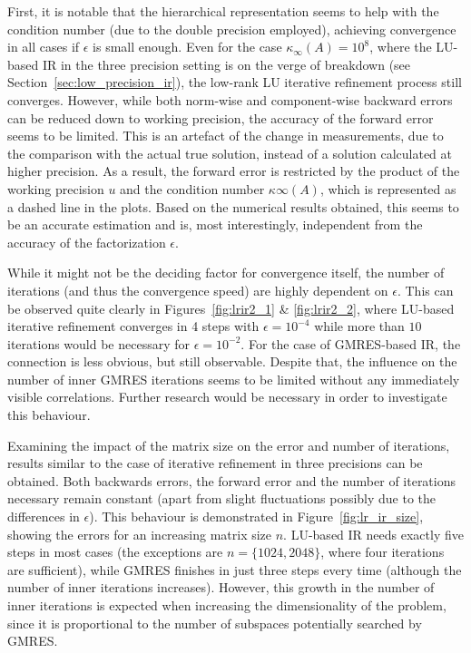 First, it is notable that the hierarchical representation seems to help with the condition number (due to the double precision employed), achieving convergence in all cases if $\epsilon$ is small enough. Even for the case $\kappa_\infty(A)=10^8$, where the LU-based IR in the three precision setting is on the verge of breakdown (see Section~\hyperref[sec:low_precision_ir]{\ref{sec:low_precision_ir}}), the low-rank LU iterative refinement process still converges. However, while both norm-wise and component-wise backward errors can be reduced down to working precision, the accuracy of the forward error seems to be limited. This is an artefact of the change in measurements, due to the comparison with the actual true solution, instead of a solution calculated at higher precision. As a result, the forward error is restricted by the product of the working precision $u$ and the condition number $\kappa\infty(A)$, which is represented as a dashed line in the plots. Based on the numerical results obtained, this seems to be an accurate estimation and is, most interestingly, independent from the accuracy of the factorization $\epsilon$.

While it might not be the deciding factor for convergence itself, the number of iterations (and thus the convergence speed) are highly dependent on $\epsilon$. This can be observed quite clearly in Figures~\hyperref[fig:lrir2_1]{\ref{fig:lrir2_1}} \& \hyperref[fig:lrir2_2]{\ref{fig:lrir2_2}}, where LU-based iterative refinement converges in 4 steps with $\epsilon = 10^{-4}$ while more than $10$ iterations would be necessary for $\epsilon = 10^{-2}$. For the case of GMRES-based IR, the connection is less obvious, but still observable. Despite that, the influence on the number of inner GMRES iterations seems to be limited without any immediately visible correlations. Further research would be necessary in order to investigate this behaviour.

Examining the impact of the matrix size on the error and number of iterations, results similar to the case of iterative refinement in three precisions can be obtained. Both backwards errors, the forward error and the number of iterations necessary remain constant (apart from slight fluctuations possibly due to the differences in $\epsilon$). This behaviour is demonstrated in Figure~\hyperref[fig:lr_ir_size]{\ref{fig:lr_ir_size}}, showing the errors for an increasing matrix size $n$. LU-based IR needs exactly five steps in most cases (the exceptions are $n = \{1024, 2048\}$, where four iterations are sufficient), while GMRES finishes in just three steps every time (although the number of inner iterations increases). However, this growth in the number of inner iterations is expected when increasing the dimensionality of the problem, since it is proportional to the number of subspaces potentially searched by GMRES. 

